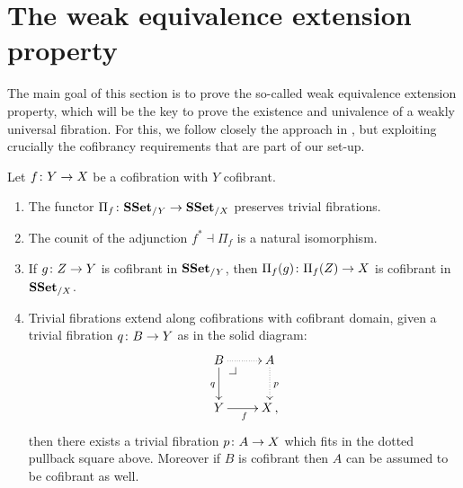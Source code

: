 \documentclass[reqno,10pt,a4paper,oneside,draft]{amsart}
\begin{document}
\section{The weak equivalence extension property}
\label{sec:equep}

The main goal of this section is to prove the so-called weak equivalence extension property, which will be the key to prove the existence and univalence of a weakly universal fibration.  For this, we follow closely the approach in \cite{voevodsky-simplicial-model}, but exploiting crucially the cofibrancy requirements that are part of our set-up.



\begin{lemma}\label{Lemma:ForTheExtProperty} Let $f \colon Y \rightarrow X$ be a cofibration with $Y$ cofibrant. 
\begin{enumerate}[$(i)$]
\item The functor $\Pi_f \colon \mathbf{SSet}_{/Y} \rightarrow \mathbf{SSet}_{/X}$ preserves trivial fibrations.
\item The counit of the adjunction $f^* \dashv \Pi_f$ is a natural isomorphism.
\item If $g \colon Z \to Y$  is cofibrant in $\mathbf{SSet}_{/Y}$, then $\Pi_f(g) \colon \Pi_f(Z) \to X$  is cofibrant in~$\mathbf{SSet}_{/X}$.
\item Trivial fibrations extend along cofibrations with cofibrant domain, \ie given a trivial fibration $q
 \colon B \to Y$  as in the solid diagram:
\[
\xymatrix{
B \ar@{.>}[r] \ar[d]_{q} \drpullback  & A \ar@{.>}[d]^{p} \\
Y \ar[r]_f &  X \, ,}
\]
then there exists a trivial fibration $p \colon A \rightarrow X$ which fits in the dotted pullback square above. Moreover if $B$ is cofibrant  then 
$A$ can be assumed to be 
cofibrant as well.
\end{enumerate}
\end{lemma}
\end{document}
